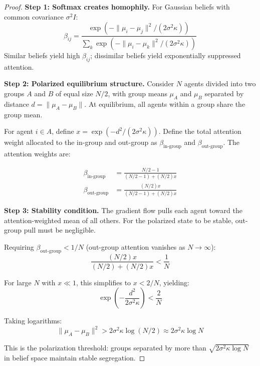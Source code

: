 \documentclass[12pt]{article}
\begin{document}
\begin{proof}
\textbf{Step 1: Softmax creates homophily.}
For Gaussian beliefs with common covariance $\sigma^2 I$:
\begin{equation}
\beta_{ij} = \frac{\exp(-\|\mu_i - \mu_j\|^2 / (2\sigma^2 \kappa))}
{\sum_k \exp(-\|\mu_i - \mu_k\|^2 / (2\sigma^2 \kappa))}
\end{equation}
Similar beliefs yield high $\beta_{ij}$; dissimilar beliefs yield exponentially 
suppressed attention.

\textbf{Step 2: Polarized equilibrium structure.}
Consider $N$ agents divided into two groups $A$ and $B$ of equal size $N/2$, 
with group means $\mu_A$ and $\mu_B$ separated by distance 
$d = \|\mu_A - \mu_B\|$. At equilibrium, all agents within a group share the 
group mean.

For agent $i \in A$, define $x = \exp(-d^2/(2\sigma^2\kappa))$. Define the total attention weight allocated to the in-group and out-group as $\beta_{\text{in-group}}$ and $\beta_{\text{out-group}}$. The attention 
weights are:

\begin{align}
\beta_{\text{in-group}} &= \frac{N/2 - 1}{(N/2 - 1) + (N/2)x} \\
\beta_{\text{out-group}} &= \frac{(N/2)x}{(N/2 - 1) + (N/2)x}
\end{align}

\textbf{Step 3: Stability condition.}
The gradient flow pulls each agent toward the attention-weighted mean of all 
others. For the polarized state to be stable, out-group pull must be negligible.

Requiring $\beta_{\text{out-group}} < 1/N$ (out-group attention vanishes as 
$N \to \infty$):
\begin{equation}
\frac{(N/2)x}{(N/2) + (N/2)x} < \frac{1}{N}
\end{equation}

For large $N$ with $x \ll 1$, this simplifies to $x < 2/N$, yielding:
\begin{equation}
\exp\left(-\frac{d^2}{2\sigma^2\kappa}\right) < \frac{2}{N}
\end{equation}

Taking logarithms:
\begin{equation}
\boxed{\|\mu_A - \mu_B\|^2 > 2\sigma^2 \kappa \log(N/2) \approx 2\sigma^2 \kappa \log N}
\end{equation}

This is the polarization threshold: groups separated by more than 
$\sqrt{2\sigma^2\kappa\log N}$ in belief space maintain stable segregation. 
\end{proof}
\end{document}
